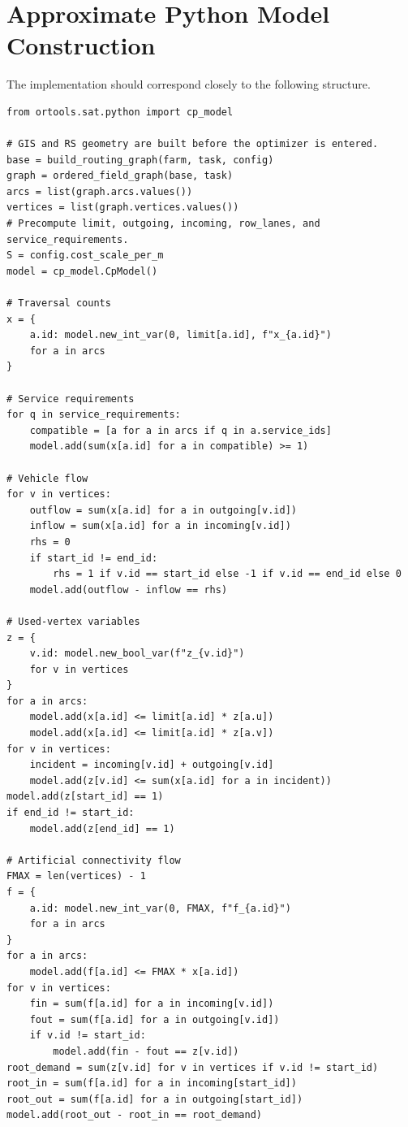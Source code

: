 \documentclass{article}
\begin{document}
\section{Approximate Python Model Construction}

The implementation should correspond closely to the following structure.

\begin{verbatim}
from ortools.sat.python import cp_model

# GIS and RS geometry are built before the optimizer is entered.
base = build_routing_graph(farm, task, config)
graph = ordered_field_graph(base, task)
arcs = list(graph.arcs.values())
vertices = list(graph.vertices.values())
# Precompute limit, outgoing, incoming, row_lanes, and service_requirements.
S = config.cost_scale_per_m
model = cp_model.CpModel()

# Traversal counts
x = {
    a.id: model.new_int_var(0, limit[a.id], f"x_{a.id}")
    for a in arcs
}

# Service requirements
for q in service_requirements:
    compatible = [a for a in arcs if q in a.service_ids]
    model.add(sum(x[a.id] for a in compatible) >= 1)

# Vehicle flow
for v in vertices:
    outflow = sum(x[a.id] for a in outgoing[v.id])
    inflow = sum(x[a.id] for a in incoming[v.id])
    rhs = 0
    if start_id != end_id:
        rhs = 1 if v.id == start_id else -1 if v.id == end_id else 0
    model.add(outflow - inflow == rhs)

# Used-vertex variables
z = {
    v.id: model.new_bool_var(f"z_{v.id}")
    for v in vertices
}
for a in arcs:
    model.add(x[a.id] <= limit[a.id] * z[a.u])
    model.add(x[a.id] <= limit[a.id] * z[a.v])
for v in vertices:
    incident = incoming[v.id] + outgoing[v.id]
    model.add(z[v.id] <= sum(x[a.id] for a in incident))
model.add(z[start_id] == 1)
if end_id != start_id:
    model.add(z[end_id] == 1)

# Artificial connectivity flow
FMAX = len(vertices) - 1
f = {
    a.id: model.new_int_var(0, FMAX, f"f_{a.id}")
    for a in arcs
}
for a in arcs:
    model.add(f[a.id] <= FMAX * x[a.id])
for v in vertices:
    fin = sum(f[a.id] for a in incoming[v.id])
    fout = sum(f[a.id] for a in outgoing[v.id])
    if v.id != start_id:
        model.add(fin - fout == z[v.id])
root_demand = sum(z[v.id] for v in vertices if v.id != start_id)
root_in = sum(f[a.id] for a in incoming[start_id])
root_out = sum(f[a.id] for a in outgoing[start_id])
model.add(root_out - root_in == root_demand)


\end{verbatim}
\end{document}
